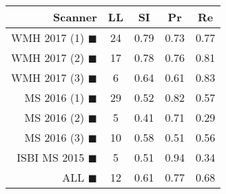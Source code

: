 \begin{tabular}{rcccc}
\toprule
Scanner & LL & SI & Pr & Re \\
\midrule
WMH 2017 (1) {\color[rgb]{ 1.00 0.00 0.00}$\blacksquare$} & 24 & 0.79 & 0.73 & 0.77 \\
WMH 2017 (2) {\color[rgb]{ 1.00 0.50 0.00}$\blacksquare$} & 17 & 0.78 & 0.76 & 0.81 \\
WMH 2017 (3) {\color[rgb]{ 1.00 0.80 0.00}$\blacksquare$} & 6 & 0.64 & 0.61 & 0.83 \\
MS  2016 (1) {\color[rgb]{ 0.20 0.80 0.00}$\blacksquare$} & 29 & 0.52 & 0.82 & 0.57 \\
MS  2016 (2) {\color[rgb]{ 0.00 0.40 1.00}$\blacksquare$} & 5 & 0.41 & 0.71 & 0.29 \\
MS  2016 (3) {\color[rgb]{ 0.60 0.00 1.00}$\blacksquare$} & 10 & 0.58 & 0.51 & 0.56 \\
ISBI MS 2015 {\color[rgb]{ 1.00 0.00 1.00}$\blacksquare$} & 5 & 0.51 & 0.94 & 0.34 \\
\midrule
ALL {\color[rgb]{ 1.00 1.00 1.00}$\blacksquare$} & 12 & 0.61 & 0.77 & 0.68 \\
\bottomrule
\end{tabular}